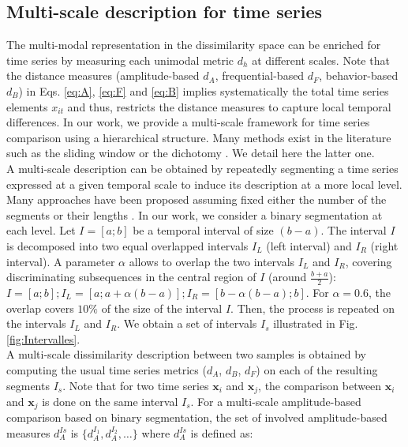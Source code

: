\subsection{Multi-scale description for time series}
The multi-modal representation in the dissimilarity space can be enriched for time series by measuring each unimodal metric $d_h$ at different scales. Note that the distance measures (amplitude-based $d_A$, frequential-based $d_F$, behavior-based $d_B$) in Eqs. \ref{eq:A}, \ref{eq:F} and \ref{eq:B} implies systematically the total time series elements $x_{it}$ and thus, restricts the distance measures to capture local temporal differences. In our work, we provide a multi-scale framework for time series comparison using a hierarchical structure. Many methods exist in the literature such as the sliding window \cite{Keogh2003a} or the dichotomy \cite{AhlameDouzal-Chouakria2011}. We detail here the latter one. \\
\indent A multi-scale description can be obtained by repeatedly segmenting a time series expressed at a given temporal scale to induce its description at a more local level. Many approaches have been proposed assuming fixed either the number of the segments or their lengths \cite{Fu2011b}. In our work, we consider a binary segmentation at each level. Let $I=[a;b]$ be a temporal interval of size $(b-a)$. The interval $I$ is decomposed into two equal overlapped intervals $I_L$ (left interval) and $I_R$ (right interval). A parameter $\alpha$ allows to overlap the two intervals $I_L$ and $I_R$, covering discriminating subsequences in the central region of $I$ (around $\frac{b+a}{2}$): $I = [a;b]; I_L = [a;a+\alpha(b-a)]; I_R = [b-\alpha(b-a);b]$. 
\noindent For $\alpha = 0.6$, the overlap covers $10\%$ of the size of the interval $I$. Then, the process is repeated on the intervals $I_L$ and $I_R$. We obtain a set of intervals $I_s$ illustrated in Fig. \ref{fig:Intervalles}. \\
A multi-scale dissimilarity description between two samples is obtained by computing the usual time series metrics ($d_A$, $d_B$, $d_F$) on each of the resulting segments $I_s$. Note that for two time series $\textbf{x}_i$ and $\textbf{x}_j$, the comparison between $\textbf{x}_i$ and $\textbf{x}_j$ is done on the same interval $I_s$. For a multi-scale amplitude-based comparison based on binary segmentation, the set of involved amplitude-based measures $d^{Is}_A$ is $\{d^{I_1}_A, d^{I_2}_A, \ldots \}$ where $d^{Is}_A$ is defined as:

